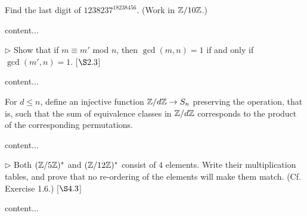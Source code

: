 \begin{exercise}
	Find the last digit of $1238237^{18238456}$. (Work in $\mathbb{Z}/10\mathbb{Z}$.)
\end{exercise}
\begin{solution}
	content...
\end{solution}

\begin{exercise}
	$\triangleright$ Show that if $m\equiv m'$ mod $n$, then $\gcd(m,n) = 1$ if and only if $\gcd(m',n) = 1$. [$\S 2.3$]
\end{exercise}
\begin{solution}
	content...
\end{solution}

\begin{exercise}
	For $d\leq n$, define an injective function $\mathbb{Z}/d\mathbb{Z} \to S_n$ preserving the operation, that is, such that the sum of equivalence classes in $\mathbb{Z}/d\mathbb{Z}$ corresponds to the product of the corresponding permutations.
\end{exercise}
\begin{solution}
	content...
\end{solution}

\begin{exercise}
	$\triangleright$ Both $(\mathbb{Z}/5\mathbb{Z})^*$ and $(\mathbb{Z}/12\mathbb{Z})^*$ consist of $4$ elements. Write their multiplication tables, and prove that no re-ordering of the elements will make them match. (Cf. Exercise 1.6.) [$\S 4.3$]
\end{exercise}
\begin{solution}
	content...
\end{solution}